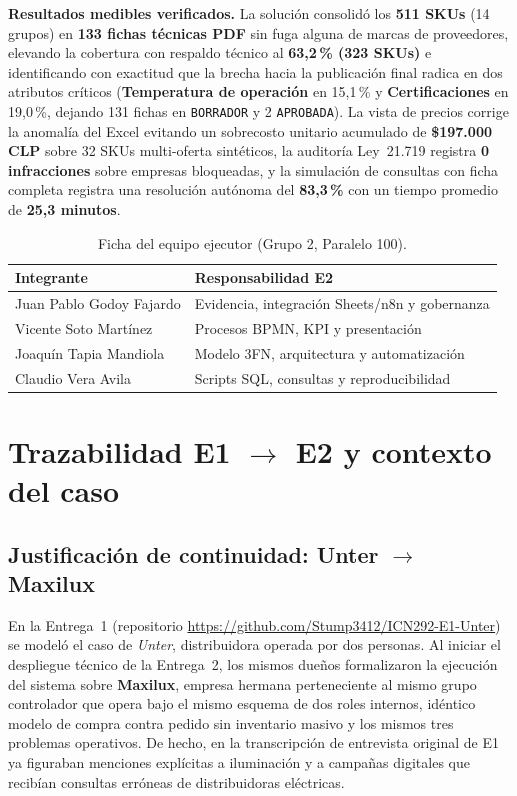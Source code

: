 \documentclass{article}
\newcommand{\theAuthorA}{Juan Pablo Godoy Fajardo}
\newcommand{\theAuthorB}{Vicente Soto Martínez}
\newcommand{\theAuthorC}{Joaquín Tapia Mandiola}
\newcommand{\theAuthorD}{Claudio Vera Avila}
\begin{document}
\textbf{Resultados medibles verificados.} La solución consolidó los \textbf{511 SKUs} (14 grupos) en \textbf{133 fichas técnicas PDF} sin fuga alguna de marcas de proveedores, elevando la cobertura con respaldo técnico al \textbf{63,2\,\% (323 SKUs)} e identificando con exactitud que la brecha hacia la publicación final radica en dos atributos críticos (\textbf{Temperatura de operación} en 15,1\,\% y \textbf{Certificaciones} en 19,0\,\%, dejando 131 fichas en \texttt{BORRADOR} y 2 \texttt{APROBADA}). La vista de precios corrige la anomalía del Excel evitando un sobrecosto unitario acumulado de \textbf{\$197.000 CLP} sobre 32 SKUs multi-oferta sintéticos, la auditoría Ley~21.719 registra \textbf{0 infracciones} sobre empresas bloqueadas, y la simulación de consultas con ficha completa registra una resolución autónoma del \textbf{83,3\,\%} con un tiempo promedio de \textbf{25,3 minutos}.

\begin{table}[H]
\centering
\small
\begin{tabularx}{\textwidth}{lL}
\toprule
\textbf{Integrante} & \textbf{Responsabilidad E2} \\
\midrule
\theAuthorA & Evidencia, integración Sheets/n8n y gobernanza \\
\theAuthorB & Procesos BPMN, KPI y presentación \\
\theAuthorC & Modelo 3FN, arquitectura y automatización \\
\theAuthorD & Scripts SQL, consultas y reproducibilidad \\
\bottomrule
\end{tabularx}
\caption{Ficha del equipo ejecutor (Grupo 2, Paralelo 100).}
\end{table}

\clearpage

\section{Trazabilidad E1 $\rightarrow$ E2 y contexto del caso}

\subsection{Justificación de continuidad: Unter $\rightarrow$ Maxilux}

En la Entrega~1 (repositorio \url{https://github.com/Stump3412/ICN292-E1-Unter}) se modeló el caso de \emph{Unter}, distribuidora operada por dos personas. Al iniciar el despliegue técnico de la Entrega~2, los mismos dueños formalizaron la ejecución del sistema sobre \textbf{Maxilux}, empresa hermana perteneciente al mismo grupo controlador que opera bajo el mismo esquema de dos roles internos, idéntico modelo de compra contra pedido sin inventario masivo y los mismos tres problemas operativos. De hecho, en la transcripción de entrevista original de E1 ya figuraban menciones explícitas a iluminación y a campañas digitales que recibían consultas erróneas de distribuidoras eléctricas.
\end{document}
